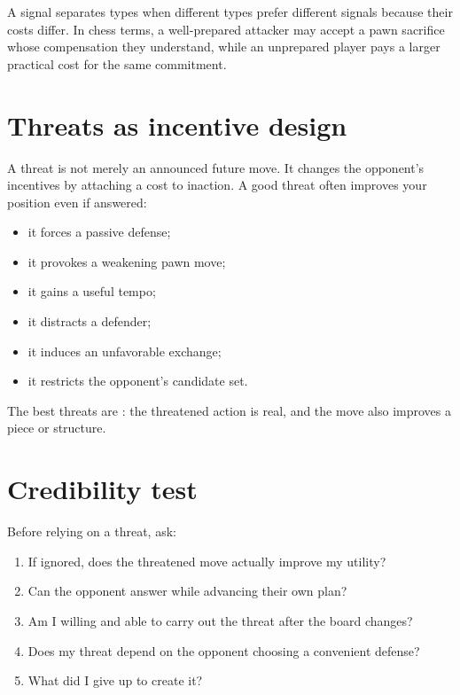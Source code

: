 \begin{formalbox}
A signal separates types when different types prefer different signals because their costs differ. In chess terms, a well-prepared attacker may accept a pawn sacrifice whose compensation they understand, while an unprepared player pays a larger practical cost for the same commitment.
\end{formalbox}

\section{Threats as incentive design}
A threat is not merely an announced future move. It changes the opponent's incentives by attaching a cost to inaction. A good threat often improves your position even if answered:

\begin{itemize}[leftmargin=1.4em]
\item it forces a passive defense;
\item it provokes a weakening pawn move;
\item it gains a useful tempo;
\item it distracts a defender;
\item it induces an unfavorable exchange;
\item it restricts the opponent's candidate set.
\end{itemize}

The best threats are : the threatened action is real, and the move also improves a piece or structure.

\section{Credibility test}
Before relying on a threat, ask:

\begin{enumerate}[label=\textbf{\arabic*.},leftmargin=2em]
\item If ignored, does the threatened move actually improve my utility?
\item Can the opponent answer while advancing their own plan?
\item Am I willing and able to carry out the threat after the board changes?
\item Does my threat depend on the opponent choosing a convenient defense?
\item What did I give up to create it?
\end{enumerate}

